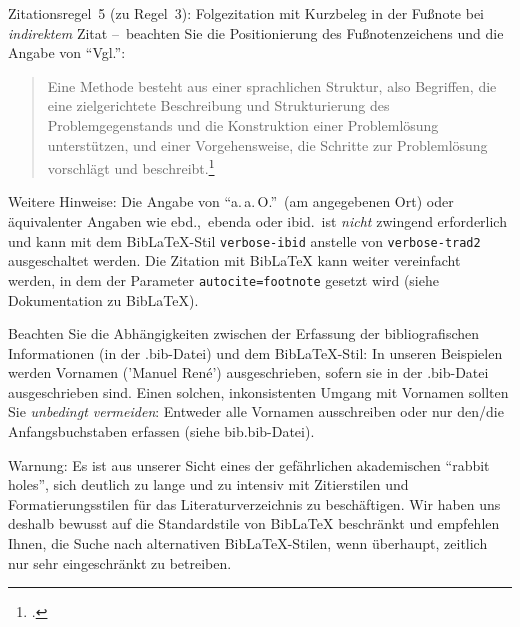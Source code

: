 


Zitationsregel~5 (zu Regel~3): Folgezitation mit Kurzbeleg in der Fußnote bei \emph{indirektem} Zitat --~beachten Sie die Positionierung des Fußnotenzeichens  und die Angabe von \enquote{Vgl.}:

\begin{quote}
Eine Methode besteht aus einer sprachlichen Struktur, also Begriffen, die eine zielgerichtete Beschreibung und Strukturierung des Problemgegenstands und die Konstruktion einer Problemlösung unterstützen, und einer Vorgehensweise, die Schritte zur Problemlösung vorschlägt und beschreibt.\footcite[Vgl.][S.~161f.]{Fran07Konfig}
\end{quote}



Weitere Hinweise: Die Angabe von \enquote{a.\,a.\,O.}\ (am angegebenen Ort) oder äquivalenter Angaben wie ebd.,\ ebenda oder ibid.\ ist \emph{nicht} zwingend erforderlich und kann mit dem BibLaTeX-Stil \verb|verbose-ibid| anstelle von \verb|verbose-trad2| ausgeschaltet werden.
%
Die Zitation mit BibLaTeX kann weiter vereinfacht werden, in dem der Parameter \verb|autocite=footnote| gesetzt wird (siehe Dokumentation zu BibLaTeX). 


Beachten Sie die Abhängigkeiten zwischen der Erfassung der bibliografischen Informationen (in der .bib-Datei) und dem BibLaTeX-Stil: In unseren Beispielen werden Vornamen ('Manuel René') ausgeschrieben, sofern sie in der .bib-Datei ausgeschrieben sind. Einen solchen, inkonsistenten Umgang mit Vornamen sollten Sie \emph{unbedingt vermeiden}: Entweder alle Vornamen ausschreiben oder nur den/die Anfangsbuchstaben erfassen (siehe bib.bib-Datei). 

Warnung: Es ist aus unserer Sicht eines der gefährlichen akademischen \enquote{rabbit holes}, sich deutlich zu lange und zu intensiv mit Zitierstilen und Formatierungsstilen für das Literaturverzeichnis zu beschäftigen. Wir haben uns deshalb bewusst auf die Standardstile von BibLaTeX beschränkt und empfehlen Ihnen, die Suche nach alternativen BibLaTeX-Stilen, wenn überhaupt, zeitlich nur sehr eingeschränkt zu betreiben. 

\newpage

%
%






